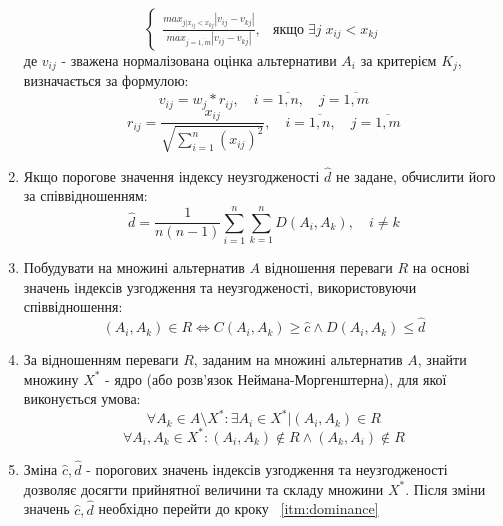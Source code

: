 \begin{enumerate}
\begin{equation}
\begin{cases}
            \frac{
                max_{j|x_{ij} < x_{kj}}
                |v_{ij} - v_{kj}|
            } {
                max_{j=\overline{1, m}}
                |v_{ij} - v_{kj}|
            },
            & \text{якщо}
            \; \exists j
            \; x_{ij} < x_{kj}
        \end{cases}
    \end{equation}
    де $v_{ij}$ - зважена нормалізована оцінка альтернативи $A_i$ за критерієм $K_j$,
    визначається за формулою:
    \begin{equation}
        \label{eq:weighted_normalized_estimate}
        v_{ij} = w_j * r_{ij},
        \quad i = \overline{1, n},
        \quad j = \overline{1, m}
    \end{equation}
    \begin{equation}
        \label{eq:normalized_estimate}
        r_{ij} = \frac{x_{ij}}{\sqrt{\sum_{i=1}^n (x_{ij})^2}},
        \quad i = \overline{1, n},
        \quad j = \overline{1, m}
    \end{equation}

    \item
    Якщо порогове значення індексу неузгодженості $\hat d$ не задане,
    обчислити його за співвідношенням:
    \begin{equation}
        \label{eq:discordance_threshold}
        \hat d =
        \frac{1}{n(n-1)}
        \sum_{i=1}^n
        \sum_{k=1}^n D(A_i, A_k),
        \quad i \neq k
    \end{equation}

    \item
    \label{itm:dominance}
    Побудувати на множині альтернатив $A$ відношення переваги $R$ на основі значень
    індексів узгодження та неузгодженості, використовуючи співвідношення:
    \begin{equation}
        \label{eq:dominance}
        (A_i, A_k) \in R
        \Leftrightarrow
        C(A_i, A_k) \geq \hat c
        \wedge
        D(A_i, A_k) \leq \hat d
    \end{equation}

    \item
    За відношенням переваги $R$, заданим на множині альтернатив $A$,
    знайти множину $X^*$ - ядро (або розв'язок Неймана-Моргенштерна),
    для якої виконується умова:
    \begin{equation}
        \label{eq:neumann_morgenstern_kernel0}
        \forall A_k \in A \setminus X^*:
        \exists A_i \in X^* | (A_i, A_k) \in R
    \end{equation}
    \begin{equation}
        \label{eq:neumann_morgenstern_kernel1}
        \forall A_i, A_k \in X^*:
        (A_i, A_k) \notin R
        \wedge
        (A_k, A_i) \notin R
    \end{equation}

    \item
    Зміна $\hat c, \hat d$ - порогових значень індексів узгодження та неузгодженості
    дозволяє досягти прийнятної величини та складу множини $X^*$.
    Після зміни значень $\hat c, \hat d$ необхідно перейти до кроку
    ~\ref{itm:dominance}
\end{enumerate}
